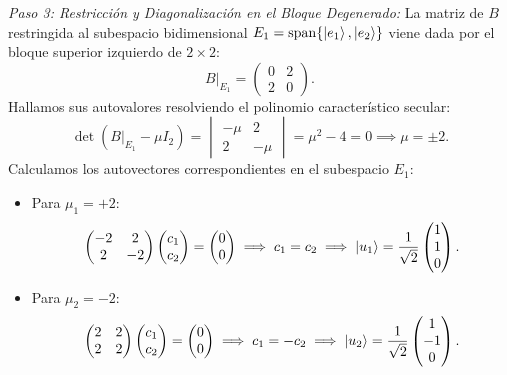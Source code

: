 \begin{ejemplobox}
    \textit{Paso 3: Restricción y Diagonalización en el Bloque Degenerado:}
    La matriz de $B$ restringida al subespacio bidimensional $E_1 = \mathrm{span}\{\left| e_1 \right\rangle, \left| e_2 \right\rangle\}$ viene dada por el bloque superior izquierdo de $2\times 2$:
    \begin{equation}
        B|_{E_1} = \begin{pmatrix} 0 & 2 \\ 2 & 0 \end{pmatrix}.
    \end{equation}
    Hallamos sus autovalores resolviendo el polinomio característico secular:
    \begin{equation}
        \det(B|_{E_1} - \mu I_2) = \begin{vmatrix} -\mu & 2 \\ 2 & -\mu \end{vmatrix} = \mu^2 - 4 = 0 \implies \mu = \pm 2.
    \end{equation}
    Calculamos los autovectores correspondientes en el subespacio $E_1$:
    \begin{itemize}
        \item Para $\mu_1 = +2$:
        \begin{equation}
            \begin{pmatrix} -2 & 2 \\ 2 & -2 \end{pmatrix}\begin{pmatrix} c_1 \\ c_2 \end{pmatrix} = \begin{pmatrix} 0 \\ 0 \end{pmatrix} \implies c_1 = c_2 \implies \left| u_1 \right\rangle = \frac{1}{\sqrt{2}}\begin{pmatrix} 1 \\ 1 \\ 0 \end{pmatrix}.
        \end{equation}
        \item Para $\mu_2 = -2$:
        \begin{equation}
            \begin{pmatrix} 2 & 2 \\ 2 & 2 \end{pmatrix}\begin{pmatrix} c_1 \\ c_2 \end{pmatrix} = \begin{pmatrix} 0 \\ 0 \end{pmatrix} \implies c_1 = -c_2 \implies \ket{u_2} = \frac{1}{\sqrt{2}}\begin{pmatrix} 1 \\ -1 \\ 0 \end{pmatrix}.

\end{equation}
\end{itemize}
\end{ejemplobox}
